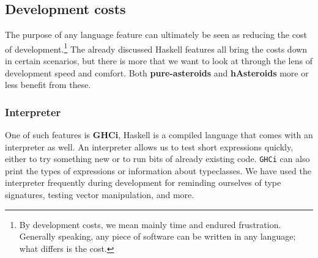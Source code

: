 \documentclass[
  digital, %
  color,   %
  table,   %
  oneside, %
  lof,     %
  lot,     %
]{fithesis3}
\begin{document}
{\subsection{Development costs}

The purpose of any language feature can ultimately be seen as reducing the cost of development.\footnote{
By development costs, we mean mainly time and endured frustration. Generally speaking,
any piece of software can be written in any language; what differs is the cost.
}
The already discussed Haskell features all bring the costs down in certain scenarios, but there is more
that we want to look at through the lens of development speed and comfort.
Both \textbf{pure-asteroids} and \textbf{hAsteroids} more or less benefit from these.

\subsubsection{Interpreter}
One of such features is \textbf{GHCi},  \cite{ghciwiki}
Haskell is a compiled language that comes with an interpreter as well.
An interpreter allows us to test short expressions quickly, either to try something new or to
run bits of already existing code. \texttt{GHCi} can also print the types of expressions
or information about typeclasses. We have used the interpreter frequently during development
for reminding ourselves of type signatures, testing vector manipulation, and more.


}
\end{document}
